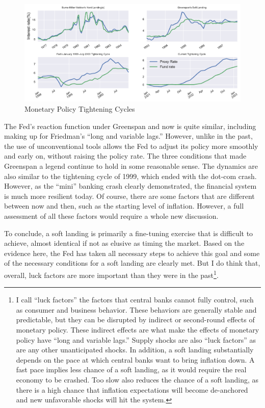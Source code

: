 \documentclass[
  letterpaper,
  DIV=11,
  numbers=noendperiod]{scrartcl}
\begin{document}
\begin{figure}

{\centering \includegraphics{Hawkish_Fed_files/figure-pdf/fig-5-output-1.pdf}

}

\caption{\label{fig-5}Monetary Policy Tightening Cycles}

\end{figure}

The Fed's reaction function under Greenspan and now is quite similar,
including making up for Friedman's ``long and variable lags.'' However,
unlike in the past, the use of unconventional tools allows the Fed to
adjust its policy more smoothly and early on, without raising the policy
rate. The three conditions that made Greenspan a legend continue to hold
in some reasonable sense. The dynamics are also similar to the
tightening cycle of 1999, which ended with the dot-com crash. However,
as the ``mini'' banking crash clearly demonstrated, the financial system
is much more resilient today. Of course, there are some factors that are
different between now and then, such as the starting level of inflation.
However, a full assessment of all these factors would require a whole
new discussion.

To conclude, a soft landing is primarily a fine-tuning exercise that is
difficult to achieve, almost identical if not as elusive as timing the
market. Based on the evidence here, the Fed has taken all necessary
steps to achieve this goal and some of the necessary conditions for a
soft landing are clearly met. But I do think that, overall, luck factors
are more important than they were in the past\footnote{I call ``luck
  factors'' the factors that central banks cannot fully control, such as
  consumer and business behavior. These behaviors are generally stable
  and predictable, but they can be disrupted by indirect or second-round
  effects of monetary policy. These indirect effects are what make the
  effects of monetary policy have ``long and variable lags.'' Supply
  shocks are also ``luck factors'' as are any other unanticipated
  shocks. In addition, a soft landing substantially depends on the pace
  at which central banks want to bring inflation down. A fast pace
  implies less chance of a soft landing, as it would require the real
  economy to be crashed. Too slow also reduces the chance of a soft
  landing, as there is a high chance that inflation expectations will
  become de-anchored and new unfavorable shocks will hit the system.}.
\end{document}
